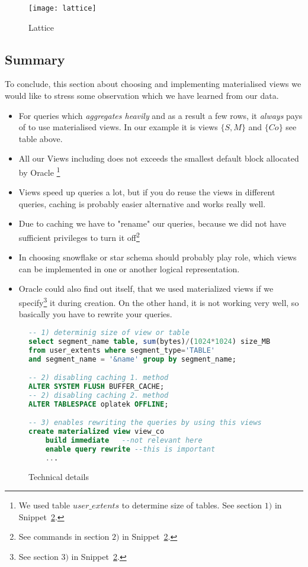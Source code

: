 \begin{figure}[!hbp]
\begin{center}
  \texttt{[image: lattice]}
\caption{\label{fig:lattice}  Lattice}
\end{center}
\end{figure}

\subsection*{Summary} 
To conclude, this section about choosing and implementing materialised views we would like to stress some observation
which we have learned from our data.
\begin{itemize}
    \item For queries which {\it aggregates heavily} and as a result a few rows, it {\it always} pays of to use materialised views. In our example it is views $\{S,M\}$ and $\{Co\}$ see table above.
    \item All our Views including does not exceeds the smallest default block allocated by Oracle 
        \footnote{We used table $user\_extents$ to determine size of tables. See section $1)$ in Snippet~\ref{s:details}.}
    \item Views speed up queries a lot, but if you do reuse the views in different queries,
    caching is probably easier alternative and works really well.
    \item Due to caching we have to "rename" our queries, 
    because we did not have sufficient privileges to turn it off\footnote{
        See commands in section $2)$ in Snippet~\ref{s:details}.}
    \item In choosing snowflake or star schema should probably play role, 
    which views can be implemented in one or another logical representation.
    \item Oracle could also find out itself, that we used materialized views 
    if we specify\footnote{See section $3)$ in Snippet~\ref{s:details}.}
    it during creation. On the other hand, it is not working very well, so basically you have to rewrite your queries.
\end{itemize}

\begin{figure}[!hbp]
\begin{center}
\begin{lstlisting}[language=sql] 
-- 1) determinig size of view or table
select segment_name table, sum(bytes)/(1024*1024) size_MB
from user_extents where segment_type='TABLE'
and segment_name = '&name' group by segment_name;

-- 2) disabling caching 1. method
ALTER SYSTEM FLUSH BUFFER_CACHE;
-- 2) disabling caching 2. method
ALTER TABLESPACE oplatek OFFLINE;

-- 3) enables rewriting the queries by using this views
create materialized view view_co 
    build immediate   --not relevant here
    enable query rewrite --this is important
    ...
\end{lstlisting}
\caption{\label{s:details}Technical details}
\end{center}
\end{figure}
